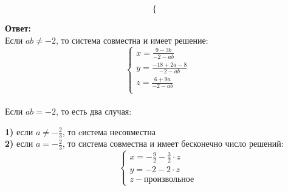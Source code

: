 \documentclass[a4paper,12pt]{article}
\begin{document}
\begin{large}
\begin{itemize}
\[\begin{cases}
\end{cases}
\]
\end{itemize}
\begin{center}
\textbf{Ответ:}\\
Если $ab \neq -2$, то система совместна и имеет решение:
\[
\begin{cases}
x =\frac{9-3b}{-2-ab}\\
y = \frac{-18+2a-8}{-2-ab}\\
z = \frac{6+9a}{-2-ab}\\
\end{cases}
\]
\\
Если $ab = -2$, то есть два случая:\\
\end{center}
\begin{center}
\textbf{1)}
если $a \neq -\frac{2}{3}$, то cистема несовместна
\\
\textbf{2)} если $a = -\frac{2}{3}$, то система совместна и имеет бесконечно число решений:
\[
\begin{cases}
x =- \frac{9}{2} - \frac{3}{2} \cdot z\\
y = -2 - 2 \cdot z\\
z - \text{произвольное}
\end{cases}
\]
\end{center}
\end{large}
\end{document}
